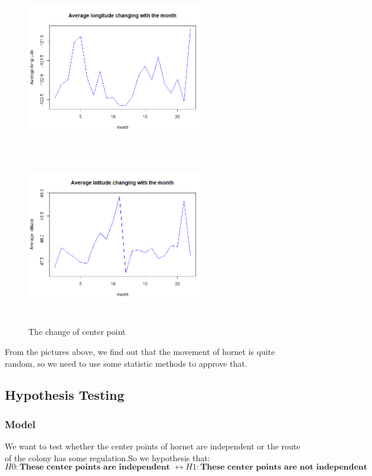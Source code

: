\documentclass[12pt]{article}
\begin{document}
\begin{figure}[H]
	\small
	\centering
	\begin{minipage}{8cm}
		\includegraphics[width=8cm,height=7cm]{./pictures/longtitude.png}
		\label{nt}
	\end{minipage}
	\begin{minipage}{8cm}
		\includegraphics[width=8cm,height=7cm]{./pictures/latitude.png}
		\label{nt}
	\end{minipage}
	\caption{The change of center point}
\end{figure}
From the pictures above, we find out that the movement of hornet is quite random, so we need to use some statistic methods to approve that.

\subsection{Hypothesis Testing}
\subsubsection{Model}
We want to test whether the center points of hornet are independent or the route of the colony has some regulation.So we hypothesis that:
\begin{equation*}
H0:\textbf{These center points are independent }\leftrightarrow H1:\textbf{These center points are not independent}
\end{equation*}
\end{document}
